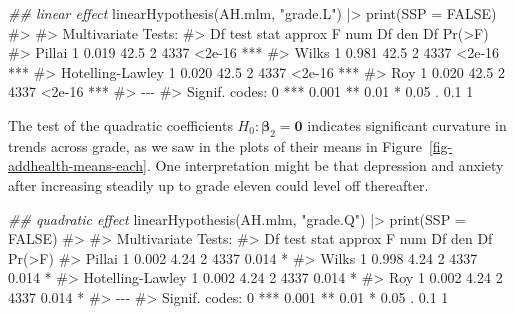 \documentclass[
  letterpaper,
  10pt,
  krantz2]{krantz}
\makeatletter
\newenvironment{Shaded}{\begin{snugshade}}{\end{snugshade}}
\newcommand{\AttributeTok}[1]{\textcolor[rgb]{0.40,0.45,0.13}{#1}}
\newcommand{\CommentTok}[1]{\textcolor[rgb]{0.37,0.37,0.37}{#1}}
\newcommand{\ConstantTok}[1]{\textcolor[rgb]{0.56,0.35,0.01}{#1}}
\newcommand{\DocumentationTok}[1]{\textcolor[rgb]{0.37,0.37,0.37}{\textit{#1}}}
\newcommand{\FunctionTok}[1]{\textcolor[rgb]{0.28,0.35,0.67}{#1}}
\newcommand{\NormalTok}[1]{\textcolor[rgb]{0.00,0.23,0.31}{#1}}
\newcommand{\SpecialCharTok}[1]{\textcolor[rgb]{0.37,0.37,0.37}{#1}}
\newcommand{\StringTok}[1]{\textcolor[rgb]{0.13,0.47,0.30}{#1}}
\newenvironment{kframe}{%
  \medskip{}
  \setlength{\fboxsep}{.8em}
  \def\at@end@of@kframe{}%
  \ifinner\ifhmode%
  \def\at@end@of@kframe{\end{minipage}}%
  \begin{minipage}{\columnwidth}%
  \fi\fi%
  \def\FrameCommand##1{\hskip\@totalleftmargin \hskip-\fboxsep
  \colorbox{shadecolor}{##1}\hskip-\fboxsep
      \hskip-\linewidth \hskip-\@totalleftmargin \hskip\columnwidth}%
  \MakeFramed {\advance\hsize-\width
    \@totalleftmargin\z@ \linewidth\hsize
    \@setminipage}}%
{\par\unskip\endMakeFramed%
  \at@end@of@kframe}
\renewenvironment{Shaded}{\begin{kframe}}{\end{kframe}}
\makeatother
\begin{document}
\begin{Shaded}
\begin{Highlighting}[]
\DocumentationTok{\#\# linear effect}
\FunctionTok{linearHypothesis}\NormalTok{(AH.mlm, }\StringTok{"grade.L"}\NormalTok{) }\SpecialCharTok{|\textgreater{}} \FunctionTok{print}\NormalTok{(}\AttributeTok{SSP =} \ConstantTok{FALSE}\NormalTok{)}
\CommentTok{\#\textgreater{} }
\CommentTok{\#\textgreater{} Multivariate Tests: }
\CommentTok{\#\textgreater{}                  Df test stat approx F num Df den Df Pr(\textgreater{}F)    }
\CommentTok{\#\textgreater{} Pillai            1     0.019     42.5      2   4337 \textless{}2e{-}16 ***}
\CommentTok{\#\textgreater{} Wilks             1     0.981     42.5      2   4337 \textless{}2e{-}16 ***}
\CommentTok{\#\textgreater{} Hotelling{-}Lawley  1     0.020     42.5      2   4337 \textless{}2e{-}16 ***}
\CommentTok{\#\textgreater{} Roy               1     0.020     42.5      2   4337 \textless{}2e{-}16 ***}
\CommentTok{\#\textgreater{} {-}{-}{-}}
\CommentTok{\#\textgreater{} Signif. codes:  0 \textquotesingle{}***\textquotesingle{} 0.001 \textquotesingle{}**\textquotesingle{} 0.01 \textquotesingle{}*\textquotesingle{} 0.05 \textquotesingle{}.\textquotesingle{} 0.1 \textquotesingle{} \textquotesingle{} 1}
\end{Highlighting}
\end{Shaded}

The test of the quadratic coefficients
\(H_0 : \boldsymbol{\beta}_2 = \boldsymbol{0}\) indicates significant
curvature in trends across grade, as we saw in the plots of their means
in Figure~\ref{fig-addhealth-means-each}. One interpretation might be
that depression and anxiety after increasing steadily up to grade eleven
could level off thereafter.

\begin{Shaded}
\begin{Highlighting}[]
\DocumentationTok{\#\# quadratic effect}
\FunctionTok{linearHypothesis}\NormalTok{(AH.mlm, }\StringTok{"grade.Q"}\NormalTok{) }\SpecialCharTok{|\textgreater{}} \FunctionTok{print}\NormalTok{(}\AttributeTok{SSP =} \ConstantTok{FALSE}\NormalTok{)}
\CommentTok{\#\textgreater{} }
\CommentTok{\#\textgreater{} Multivariate Tests: }
\CommentTok{\#\textgreater{}                  Df test stat approx F num Df den Df Pr(\textgreater{}F)  }
\CommentTok{\#\textgreater{} Pillai            1     0.002     4.24      2   4337  0.014 *}
\CommentTok{\#\textgreater{} Wilks             1     0.998     4.24      2   4337  0.014 *}
\CommentTok{\#\textgreater{} Hotelling{-}Lawley  1     0.002     4.24      2   4337  0.014 *}
\CommentTok{\#\textgreater{} Roy               1     0.002     4.24      2   4337  0.014 *}
\CommentTok{\#\textgreater{} {-}{-}{-}}
\CommentTok{\#\textgreater{} Signif. codes:  0 \textquotesingle{}***\textquotesingle{} 0.001 \textquotesingle{}**\textquotesingle{} 0.01 \textquotesingle{}*\textquotesingle{} 0.05 \textquotesingle{}.\textquotesingle{} 0.1 \textquotesingle{} \textquotesingle{} 1}
\end{Highlighting}
\end{Shaded}
\end{document}
